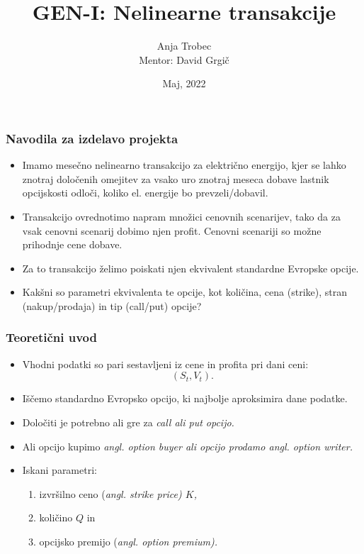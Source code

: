 \documentclass[10pt]{beamer}
\title{GEN-I: Nelinearne transakcije}
\author{\centering Anja Trobec \\ Mentor: David Grgič}
\institute{\centering Fakulteta za Matematiko in Fiziko}
\date{\centering Maj, 2022}
\begin{document}
\frame{\titlepage}

\begin{frame}
\frametitle{Navodila za izdelavo projekta}
\begin{itemize}
\item{Imamo mesečno nelinearno transakcijo za električno energijo, kjer se lahko znotraj določenih omejitev za vsako uro znotraj meseca dobave lastnik opcijskosti odloči, koliko el. energije bo prevzeli/dobavil. }
\item{Transakcijo ovrednotimo napram množici cenovnih scenarijev, tako da za vsak cenovni scenarij dobimo njen profit. Cenovni scenariji so možne prihodnje cene dobave.}
\item{Za to transakcijo želimo poiskati njen ekvivalent standardne Evropske opcije.}
\item{Kakšni so parametri ekvivalenta te opcije, kot količina, cena (strike), stran (nakup/prodaja) in tip (call/put) opcije?}
\end{itemize}
\end{frame}


\begin{frame}
\frametitle{Teoretični uvod}
\begin{itemize}
\item{Vhodni podatki so pari sestavljeni iz cene in profita pri dani ceni: $$(S_t,V_t).$$}
\item{Iščemo standardno Evropsko opcijo, ki najbolje aproksimira dane podatke.}
\item{Določiti je potrebno ali gre za \it{call} ali \it{put} opcijo.}
\item{Ali opcijo kupimo \it{angl. option buyer} ali opcijo prodamo \it{angl. option writer}. }
\item{Iskani parametri:
\begin{enumerate}
\item{izvršilno ceno (\it{angl. strike price}) $K$,}
\item{količino $Q$ in}
\item{opcijsko premijo (\it{angl. option premium}).} 
\end{enumerate}
}
\end{itemize}
\end{frame}
\end{document}
